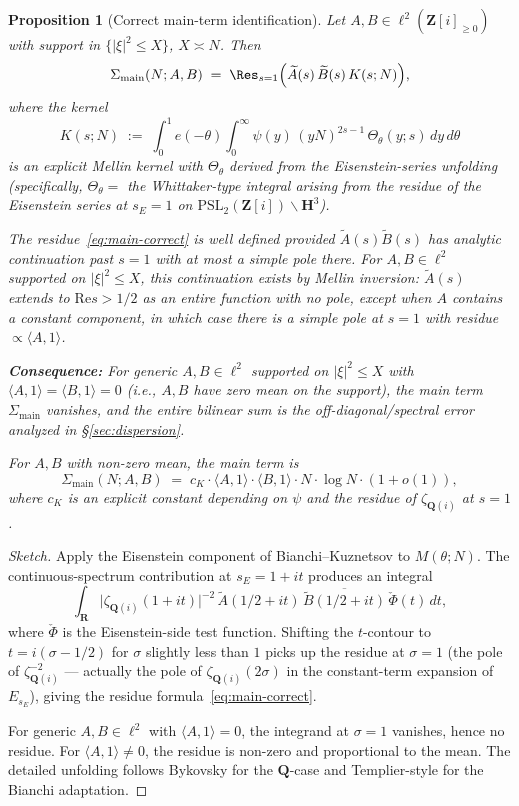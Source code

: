 \documentclass[11pt]{article}
\newtheorem{proposition}[theorem]{Proposition}
\theoremstyle{definition}
\newcommand{\Z}{\mathbf{Z}}
\newcommand{\Q}{\mathbf{Q}}
\newcommand{\R}{\mathbf{R}}
\newcommand{\HH}{\mathbf{H}}
\newcommand{\Zi}{\Z[i]}
\renewcommand{\Re}{\mathrm{Re}}
\begin{document}
\begin{proposition}[Correct main-term identification]\label{prop:main-correct}
Let $A,B\in\ell^2(\Zi_{\ge 0})$ with support in $\{|\xi|^2\le X\}$, $X\asymp N$. Then
\begin{equation}\label{eq:main-correct}
\Sigma_{\mathrm{main}}(N;A,B)\;=\;\Res_{s=1}\Bigl(\widetilde A(s)\,\widetilde B(s)\,K(s;N)\Bigr),
\end{equation}
where the kernel
\[
K(s;N)\;:=\;\int_0^1 e(-\theta)\int_0^\infty\psi(y)\,(yN)^{2s-1}\,\Theta_\theta(y;s)\,dy\,d\theta
\]
is an explicit Mellin kernel with $\Theta_\theta$ derived from the Eisenstein-series unfolding (specifically, $\Theta_\theta=$ the Whittaker-type integral arising from the residue of the Eisenstein series at $s_E=1$ on $\mathrm{PSL}_2(\Zi)\backslash\HH^3$).

The residue~\eqref{eq:main-correct} is well defined provided $\widetilde A(s)\widetilde B(s)$ has analytic continuation past $s=1$ with at most a simple pole there. For $A,B\in\ell^2$ supported on $|\xi|^2\le X$, this continuation exists by Mellin inversion: $\widetilde A(s)$ extends to $\Re s>1/2$ as an entire function with no pole, except when $A$ contains a constant component, in which case there is a simple pole at $s=1$ with residue $\propto\langle A,1\rangle$.

\textbf{Consequence:} For \emph{generic} $A,B\in\ell^2$ supported on $|\xi|^2\le X$ with $\langle A,1\rangle=\langle B,1\rangle=0$ (i.e., $A,B$ have zero mean on the support), the main term $\Sigma_{\mathrm{main}}$ \emph{vanishes}, and the entire bilinear sum is the off-diagonal/spectral error analyzed in \S\ref{sec:dispersion}.

For $A,B$ with non-zero mean, the main term is
\[
\Sigma_{\mathrm{main}}(N;A,B)\;=\;c_K\cdot\langle A,1\rangle\cdot\langle B,1\rangle\cdot N\cdot\log N\cdot(1+o(1)),
\]
where $c_K$ is an explicit constant depending on $\psi$ and the residue of $\zeta_{\Q(i)}$ at $s=1$.
\end{proposition}

\begin{proof}[Sketch]
Apply the Eisenstein component of Bianchi--Kuznetsov to $M(\theta;N)$. The continuous-spectrum contribution at $s_E=1+it$ produces an integral
\[
\int_{\R}\bigl|\zeta_{\Q(i)}(1+it)\bigr|^{-2}\,\widetilde A(1/2+it)\,\overline{\widetilde B(1/2+it)}\,\check\Phi(t)\,dt,
\]
where $\check\Phi$ is the Eisenstein-side test function. Shifting the $t$-contour to $t=i(\sigma-1/2)$ for $\sigma$ slightly less than $1$ picks up the residue at $\sigma=1$ (the pole of $\zeta_{\Q(i)}^{-2}$ — actually the pole of $\zeta_{\Q(i)}(2\sigma)$ in the constant-term expansion of $E_{s_E}$), giving the residue formula~\eqref{eq:main-correct}.

For generic $A,B\in\ell^2$ with $\langle A,1\rangle=0$, the integrand at $\sigma=1$ vanishes, hence no residue. For $\langle A,1\rangle\ne 0$, the residue is non-zero and proportional to the mean. The detailed unfolding follows Bykovsky \cite{bykovsky} for the $\Q$-case and Templier-style \cite{templier} for the Bianchi adaptation.
\end{proof}
\end{document}
